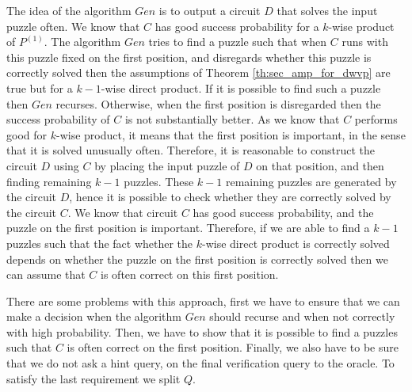 The idea of the algorithm $Gen$ is to output a circuit $D$ that solves the input puzzle often.
We know that $C$ has good success probability for a $k$-wise product of $P^{(1)}$.
The algorithm $Gen$ tries to find a puzzle such that when $C$ runs with this puzzle fixed
on the first position, and disregards whether this puzzle is correctly solved
then the assumptions of Theorem \ref{th:sec_amp_for_dwvp} are true but for a $k-1$-wise direct product.
If it is possible to find such a puzzle then $Gen$ recurses.
Otherwise, when the first position is disregarded then the success probability of $C$ is not substantially better.
As we know that $C$ performs good for $k$-wise product, it means that the first position is important, in the sense that
it is solved unusually often.
Therefore, it is reasonable to construct the circuit $D$ using $C$ by placing the input puzzle of $D$ on that position, and then
finding remaining $k-1$ puzzles. These $k-1$ remaining puzzles are generated by the circuit $D$, hence it is possible to check
whether they are correctly solved by the circuit $C$. We know that circuit $C$ has good success probability, and the puzzle on the first
position is important. Therefore, if we are able to find a $k-1$ puzzles such that the fact whether the $k$-wise direct product is correctly
solved depends on whether the puzzle on the first position is correctly solved then we can assume that $C$ is often correct on this first position.

There are some problems with this approach, first we have to ensure that we can make a decision when the algorithm $Gen$ should recurse and when not
correctly with high probability. Then, we have to show that it is possible to find a puzzles such that $C$ is often correct on the first position.
Finally, we also have to be sure that we do not ask a hint query, on the final verification query to the oracle.
To satisfy the last requirement we split $Q$.

